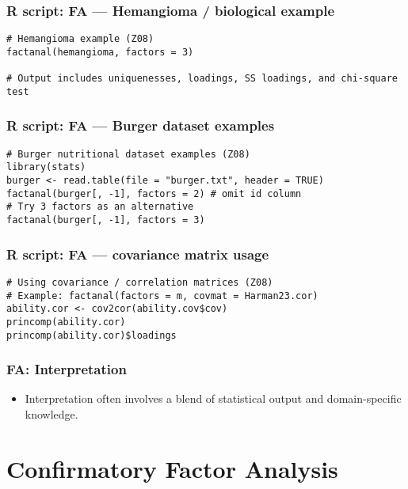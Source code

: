 \documentclass{beamer}
\begin{document}
\begin{frame}[fragile]
    \frametitle{R script: FA — Hemangioma / biological example}
    \begin{verbatim}
# Hemangioma example (Z08)
factanal(hemangioma, factors = 3)

# Output includes uniquenesses, loadings, SS loadings, and chi-square test
    \end{verbatim}
\end{frame}

\begin{frame}[fragile]
    \frametitle{R script: FA — Burger dataset examples}
    \begin{verbatim}
# Burger nutritional dataset examples (Z08)
library(stats)
burger <- read.table(file = "burger.txt", header = TRUE)
factanal(burger[, -1], factors = 2) # omit id column
# Try 3 factors as an alternative
factanal(burger[, -1], factors = 3)
    \end{verbatim}
\end{frame}

\begin{frame}[fragile]
    \frametitle{R script: FA — covariance matrix usage}
    \begin{verbatim}
# Using covariance / correlation matrices (Z08)
# Example: factanal(factors = m, covmat = Harman23.cor)
ability.cor <- cov2cor(ability.cov$cov)
princomp(ability.cor)
princomp(ability.cor)$loadings
    \end{verbatim}
\end{frame}

\begin{frame}
    \frametitle{FA: Interpretation}
    \begin{itemize}
        \item Interpretation often involves a blend of statistical output and domain-specific knowledge.
    \end{itemize}
\end{frame}

\section{Confirmatory Factor Analysis}
\end{document}
